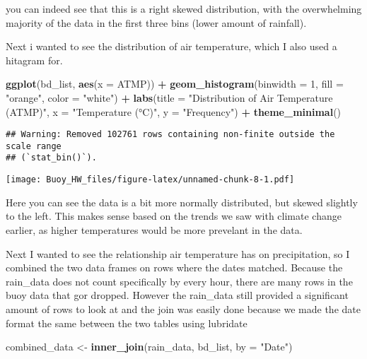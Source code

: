 \documentclass[
]{article}
\newenvironment{Shaded}{\begin{snugshade}}{\end{snugshade}}
\newcommand{\AttributeTok}[1]{\textcolor[rgb]{0.13,0.29,0.53}{#1}}
\newcommand{\DecValTok}[1]{\textcolor[rgb]{0.00,0.00,0.81}{#1}}
\newcommand{\FunctionTok}[1]{\textcolor[rgb]{0.13,0.29,0.53}{\textbf{#1}}}
\newcommand{\NormalTok}[1]{#1}
\newcommand{\OtherTok}[1]{\textcolor[rgb]{0.56,0.35,0.01}{#1}}
\newcommand{\SpecialCharTok}[1]{\textcolor[rgb]{0.81,0.36,0.00}{\textbf{#1}}}
\newcommand{\StringTok}[1]{\textcolor[rgb]{0.31,0.60,0.02}{#1}}
\begin{document}
you can indeed see that this is a right skewed distribution, with the
overwhelming majority of the data in the first three bins (lower amount
of rainfall).

Next i wanted to see the distribution of air temperature, which I also
used a hitagram for.

\begin{Shaded}
\begin{Highlighting}[]
\FunctionTok{ggplot}\NormalTok{(bd\_list, }\FunctionTok{aes}\NormalTok{(}\AttributeTok{x =}\NormalTok{ ATMP)) }\SpecialCharTok{+}
  \FunctionTok{geom\_histogram}\NormalTok{(}\AttributeTok{binwidth =} \DecValTok{1}\NormalTok{, }\AttributeTok{fill =} \StringTok{"orange"}\NormalTok{, }\AttributeTok{color =} \StringTok{"white"}\NormalTok{) }\SpecialCharTok{+}
  \FunctionTok{labs}\NormalTok{(}\AttributeTok{title =} \StringTok{"Distribution of Air Temperature (ATMP)"}\NormalTok{,}
       \AttributeTok{x =} \StringTok{"Temperature (°C)"}\NormalTok{,}
       \AttributeTok{y =} \StringTok{"Frequency"}\NormalTok{) }\SpecialCharTok{+}
  \FunctionTok{theme\_minimal}\NormalTok{()}
\end{Highlighting}
\end{Shaded}

\begin{verbatim}
## Warning: Removed 102761 rows containing non-finite outside the scale range
## (`stat_bin()`).
\end{verbatim}

\texttt{[image: Buoy\_HW\_files/figure-latex/unnamed-chunk-8-1.pdf]}

Here you can see the data is a bit more normally distributed, but skewed
slightly to the left. This makes sense based on the trends we saw with
climate change earlier, as higher temperatures would be more prevelant
in the data.

Next I wanted to see the relationship air temperature has on
precipitation, so I combined the two data frames on rows where the dates
matched. Because the rain\_data does not count specifically by every
hour, there are many rows in the buoy data that gor dropped. However the
rain\_data still provided a significant amount of rows to look at and
the join was easily done because we made the date format the same
between the two tables using lubridate

\begin{Shaded}
\begin{Highlighting}[]
\NormalTok{combined\_data }\OtherTok{\textless{}{-}} \FunctionTok{inner\_join}\NormalTok{(rain\_data, bd\_list, }\AttributeTok{by =} \StringTok{"Date"}\NormalTok{)}
\end{Highlighting}
\end{Shaded}
\end{document}
